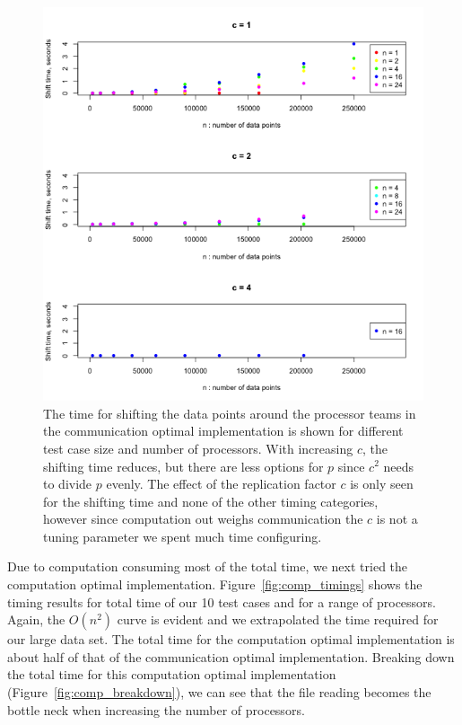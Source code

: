 \begin{figure}[!h]
   \centering
   \includegraphics[width=\textwidth]{./fig/comm_allc_comm.png} %
   \caption{The time for shifting the data points around the processor teams in the communication optimal implementation is shown for different test case size and number of processors. With increasing $c$, the shifting time reduces, but there are less options for $p$ since $c^2$ needs to divide $p$ evenly. The effect of the replication factor $c$ is only seen for the shifting time and none of the other timing categories, however since computation out weighs communication the $c$ is not a tuning parameter we spent much time configuring.}
   \label{fig:comm_allc_comm}
\end{figure}

Due to computation consuming most of the total time, we next tried the computation optimal implementation. Figure~\ref{fig:comp_timings} shows the timing results for total time of our 10 test cases and for a range of processors. Again, the $O(n^2)$ curve is evident and we extrapolated the time required for our large data set. The total time for the computation optimal implementation is about half of that of the communication optimal implementation. Breaking down the total time for this computation optimal implementation (Figure~\ref{fig:comp_breakdown}), we can see that the file reading becomes the bottle neck  when increasing the number of processors. 


